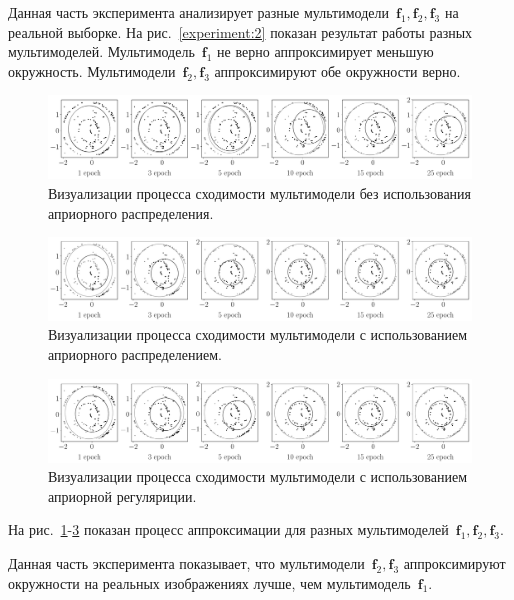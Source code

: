 Данная часть эксперимента анализирует разные мультимодели~$\textbf{f}_1, \textbf{f}_2, \textbf{f}_3$ на реальной выборке.
На рис.~\ref{experiment:2} показан результат работы разных мультимоделей.
Мультимодель~$\textbf{f}_1$  не верно аппроксимирует меньшую окружность.
Мультимодели~$\textbf{f}_2, \textbf{f}_3$ аппроксимируют обе окружности верно.

\begin{figure}[h!t]\center
\includegraphics[width=1\textwidth]{results/priorexpert/experiment_real_not_prior}
\caption{Визуализации процесса сходимости мультимодели без использования априорного распределения.}
\label{experiment:3}
\end{figure}

\begin{figure}[h!t]\center
\includegraphics[width=1\textwidth]{results/priorexpert/experiment_real_prior}
\caption{Визуализации процесса сходимости мультимодели с использованием априорного распределением.}
\label{experiment:4}
\end{figure}

\begin{figure}[h!t]\center
\includegraphics[width=1\textwidth]{results/priorexpert/experiment_real_regular}
\caption{Визуализации процесса сходимости мультимодели с использованием априорной регуляриции.}
\label{experiment:5}
\end{figure}

На рис.~\ref{experiment:3}-\ref{experiment:5} показан процесс аппроксимации для разных мультимоделей~$\textbf{f}_1, \textbf{f}_2, \textbf{f}_3$.

Данная часть эксперимента показывает, что мультимодели~$\textbf{f}_2, \textbf{f}_3$ аппроксимируют окружности на реальных изображениях лучше, чем мультимодель~$\textbf{f}_1$.